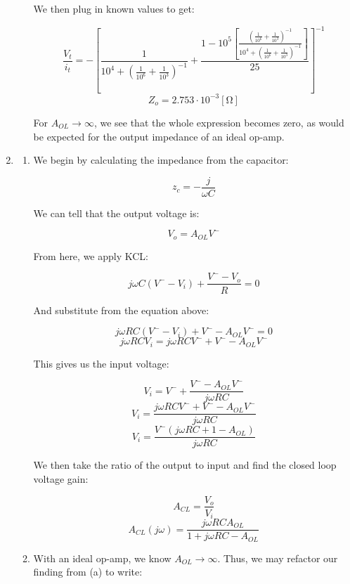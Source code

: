 \begin{enumerate}
\begin{enumerate}
        We then plug in known values to get:

        $$\frac{V_t}{i_t}=-\left[\frac{1}{10^4+\left( \frac{1}{10^6}+\frac{1}{10^3} \right)^{-1}}+\frac{1-10^5\left[\frac{\left( \frac{1}{10^6}+\frac{1}{10^3} \right)^{-1}}{10^4+\left( \frac{1}{10^6}+\frac{1}{10^3} \right)^{-1}}\right]}{25}\right]^{-1}$$
        $$\boxed{Z_o=2.753\cdot10^{-3}[\si{\ohm}]}$$

        For $A_{OL}\to\infty$, we see that the whole expression becomes zero, as would be expected for the output impedance of an ideal op-amp.

    \end{enumerate}

  \item

    \begin{enumerate}

      \item 

        We begin by calculating the impedance from the capacitor:

        $$z_c=-\frac{j}{\omega C}$$

        We can tell that the output voltage is:

        $$V_o=A_{OL}V^{-}$$

        From here, we apply KCL:

        $$j\omega C(V^{-}-V_i)+\frac{V^{-}-V_o}{R}=0$$

        And substitute from the equation above:

        $$j\omega RC(V^{-}-V_i)+V^{-}-A_{OL}V^{-}=0$$
        $$j\omega RCV_i=j\omega RCV^{-}+V^{-}-A_{OL}V^{-}$$

        This gives us the input voltage:

        $$V_i=V^{-}+\frac{V^{-}-A_{OL}V^{-}}{j\omega RC}$$
        $$V_i=\frac{j\omega RCV^{-}+V^{-}-A_{OL}V^{-}}{j\omega RC}$$
        $$V_i=\frac{V^{-}(j\omega RC+1-A_{OL})}{j\omega RC}$$

        We then take the ratio of the output to input and find the closed loop voltage gain:

        $$A_{CL}=\frac{V_o}{V_i}$$
        $$\boxed{A_{CL}(j\omega)=\frac{j\omega RCA_{OL}}{1+j\omega RC-A_{OL}}}$$

      \item 

        With an ideal op-amp, we know $A_{OL}\to\infty$. Thus, we may refactor our finding from (a) to write:


\end{enumerate}
\end{enumerate}
